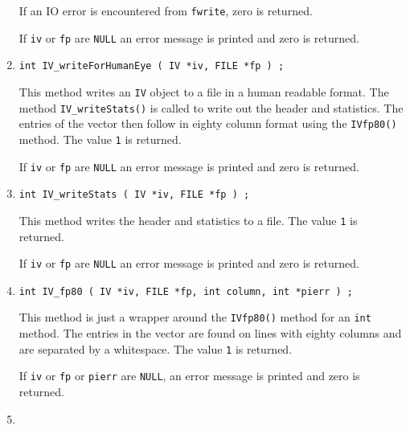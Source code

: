 \begin{enumerate}
If an IO error is encountered from {\tt fwrite}, zero is returned.
\par {}
If {\tt iv} or {\tt fp} are {\tt NULL} an error message is printed and
zero is returned.
\item
\begin{verbatim}
int IV_writeForHumanEye ( IV *iv, FILE *fp ) ;
\end{verbatim}
\par
This method writes an {\tt IV} object to a file in a human readable
format.
The method {\tt IV\_writeStats()} is called to write out the
header and statistics. 
The entries of the vector then follow in eighty column format
using the {\tt IVfp80()} method.
The value {\tt 1} is returned.
\par {}
If {\tt iv} or {\tt fp} are {\tt NULL} an error message 
is printed and zero is returned.
\item
\begin{verbatim}
int IV_writeStats ( IV *iv, FILE *fp ) ;
\end{verbatim}
\par
This method writes the header and statistics to a file.
The value {\tt 1} is returned.
\par {}
If {\tt iv} or {\tt fp} are {\tt NULL} an error message 
is printed and zero is returned.
\item
\begin{verbatim}
int IV_fp80 ( IV *iv, FILE *fp, int column, int *pierr ) ;
\end{verbatim}
\par
This method is just a wrapper around the {\tt IVfp80()} method for
an {\tt int} method. 
The entries in the vector are found on lines with eighty columns
and are separated by a whitespace.
The value {\tt 1} is returned.
\par {}
If {\tt iv} or {\tt fp} or {\tt pierr} are {\tt NULL}, 
an error message is printed and zero is returned.
\item
\begin{verbatim}

\end{verbatim}
\end{enumerate}
